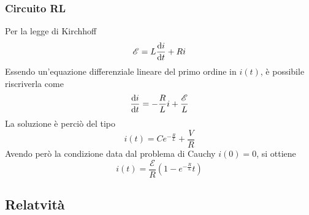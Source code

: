 \subsubsection{Circuito RL}
\begin{center}
\end{center}
Per la legge di Kirchhoff
\begin{equation*}
  \mathcal{E} = L\frac{\mathop{}\!\mathrm{d} i}{\mathop{}\!\mathrm{d} t}+Ri
\end{equation*}
Essendo un'equazione differenziale lineare del primo ordine in $i(t)$, è possibile riscriverla
come
\begin{equation*}
  \frac{\mathop{}\!\mathrm{d} i}{\mathop{}\!\mathrm{d} t}=-\frac{R}{L}i+\frac{\mathcal{E}}{L}
\end{equation*}
La soluzione è perciò del tipo
\begin{equation*}
  i(t) = Ce^{-\frac{R}{L}}+\frac{V}{R}
\end{equation*}
Avendo però la condizione data dal problema di Cauchy $i(0)=0$, si ottiene
\begin{equation*}
  i(t)=\frac{\mathcal{E}}{R}\left( 1-e^{-\frac{R}{L}}t \right)
\end{equation*}
\subsection{Relatvità}
